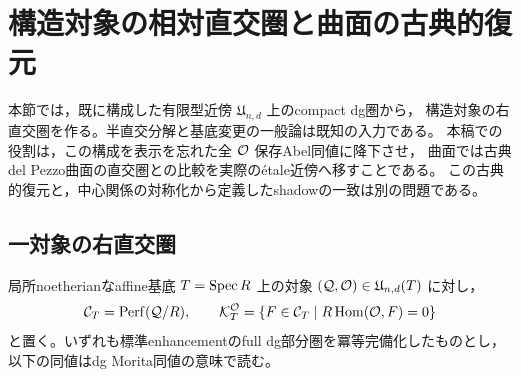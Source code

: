 \section{構造対象の相対直交圏と曲面の古典的復元}
\label{sec:kuznetsov-relative}

本節では，既に構成した有限型近傍 $\mathfrak U_{n,d}$ 上のcompact dg圏から，
構造対象の右直交圏を作る。半直交分解と基底変更の一般論は既知の入力である。
本稿での役割は，この構成を表示を忘れた全 $\mathcal O$ 保存Abel同値に降下させ，
曲面では古典del Pezzo曲面の直交圏との比較を実際の\'{e}tale近傍へ移すことである。
この古典的復元と，中心関係の対称化から定義したshadowの一致は別の問題である。

\subsection{一対象の右直交圏}

局所noetherianなaffine基底 $T=\operatorname{Spec} R$ 上の対象
$(\mathcal Q,\mathcal O)\in\mathfrak U_{n,d}(T)$ に対し，
\[
 \mathcal C_T=\operatorname{Perf}(\mathcal Q/R),\qquad
 \mathcal K_T^{\mathcal O}
 =\{F\in\mathcal C_T\mid R\operatorname{Hom}(\mathcal O,F)=0\}
\]
と置く。いずれも標準enhancementのfull dg部分圏を冪等完備化したものとし，
以下の同値はdg Morita同値の意味で読む。


